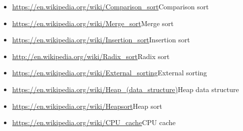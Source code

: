 \documentclass[12pt]{book}
\theoremstyle{exercise}
\begin{document}
\begin{itemize}
\item
  \url{https://en.wikipedia.org/wiki/Comparison_sort}{Comparison sort}
\item
  \url{https://en.wikipedia.org/wiki/Merge_sort}{Merge sort}
\item
  \url{https://en.wikipedia.org/wiki/Insertion_sort}{Insertion sort}
\item
  \url{http://en.wikipedia.org/wiki/Radix_sort}{Radix sort}
\item
  \url{https://en.wikipedia.org/wiki/External_sorting}{External
  sorting}
\item
  \url{https://en.wikipedia.org/wiki/Heap_(data_structure)}{Heap data
  structure}
\item
  \url{https://en.wikipedia.org/wiki/Heapsort}{Heap sort}
\item
  \url{https://en.wikipedia.org/wiki/CPU_cache}{CPU cache}
\end{itemize}



\backmatter
\printindex

\end{document}
